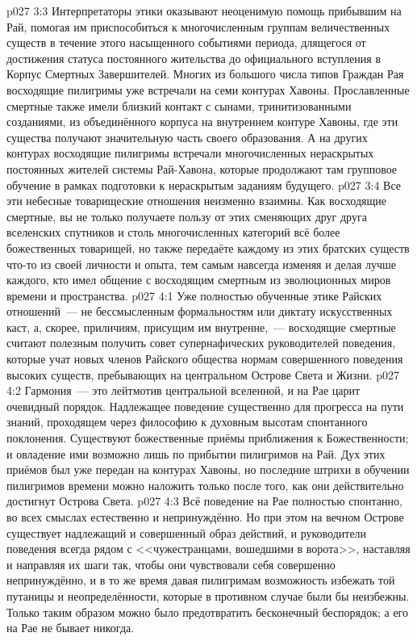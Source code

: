 \vs p027 3:3 Интерпретаторы этики оказывают неоценимую помощь прибывшим на Рай, помогая им приспособиться к многочисленным группам величественных существ в течение этого насыщенного событиями периода, длящегося от достижения статуса постоянного жительства до официального вступления в Корпус Смертных Завершителей. Многих из большого числа типов Граждан Рая восходящие пилигримы уже встречали на семи контурах Хавоны. Прославленные смертные также имели близкий контакт с сынами, тринитизованными созданиями, из объединённого корпуса на внутреннем контуре Хавоны, где эти существа получают значительную часть своего образования. А на других контурах восходящие пилигримы встречали многочисленных нераскрытых постоянных жителей системы Рай\hyp{}Хавона, которые продолжают там групповое обучение в рамках подготовки к нераскрытым заданиям будущего.
\vs p027 3:4 Все эти небесные товарищеские отношения неизменно взаимны. Как восходящие смертные, вы не только получаете пользу от этих сменяющих друг друга вселенских спутников и столь многочисленных категорий всё более божественных товарищей, но также передаёте каждому из этих братских существ что\hyp{}то из своей личности и опыта, тем самым навсегда изменяя и делая лучше каждого, кто имел общение с восходящим смертным из эволюционных миров времени и пространства.
\vs p027 4:1 Уже полностью обученные этике Райских отношений~--- не бессмысленным формальностям или диктату искусственных каст, а, скорее, приличиям, присущим им внутренне,~--- восходящие смертные считают полезным получить совет супернафических руководителей поведения, которые учат новых членов Райского общества нормам совершенного поведения высоких существ, пребывающих на центральном Острове Света и Жизни.
\vs p027 4:2 Гармония~--- это лейтмотив центральной вселенной, и на Рае царит очевидный порядок. Надлежащее поведение существенно для прогресса на пути знаний, проходящем через философию к духовным высотам спонтанного поклонения. Существуют божественные приёмы приближения к Божественности; и овладение ими возможно лишь по прибытии пилигримов на Рай. Дух этих приёмов был уже передан на контурах Хавоны, но последние штрихи в обучении пилигримов времени можно наложить только после того, как они действительно достигнут Острова Света.
\vs p027 4:3 Всё поведение на Рае полностью спонтанно, во всех смыслах естественно и непринуждённо. Но при этом на вечном Острове существует надлежащий и совершенный образ действий, и руководители поведения всегда рядом с <<чужестранцами, вошедшими в ворота>>, наставляя и направляя их шаги так, чтобы они чувствовали себя совершенно непринуждённо, и в то же время давая пилигримам возможность избежать той путаницы и неопределённости, которые в противном случае были бы неизбежны. Только таким образом можно было предотвратить бесконечный беспорядок; а его на Рае не бывает никогда.
